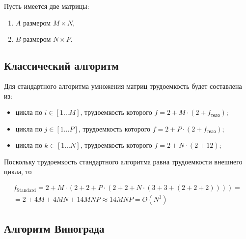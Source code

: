 Пусть имеется две матрицы:

\begin{enumerate}
    \item $A$ размером $M \times N$,
    \item $B$ размером $N \times P$.
\end{enumerate}

\subsection{Классический алгоритм}

Для стандартного алгоритма умножения матриц трудоемкость будет составлена из:

\begin{itemize}
    \item цикла по $i \in [1 \ldots M]$, трудоемкость которого $f = 2 + M \cdot (2 + f_\text{тело})$;
    \item цикла по $j \in [1 \ldots P]$, трудоемкость которого $f = 2 + P \cdot (2 + f_\text{тело})$;
    \item цикла по $k \in [1 \ldots N]$, трудоемкость которого $f = 2 + N \cdot (2 + 12)$;
\end{itemize}

Поскольку трудоемкость стандартного алгоритма равна трудоемкости внешнего цикла, то

\begin{equation}
    \begin{gathered}
        f_\text{Standard} = 2 + M \cdot (2 + 2 + P \cdot (2 + 2 + N \cdot (3 + 3 + (2 + 2 + 2)))) = \\
        = 2 + 4M + 4MN + 14MNP \approx 14MNP = O(N^3)
    \end{gathered}
\end{equation}

\subsection{Алгоритм Винограда}

